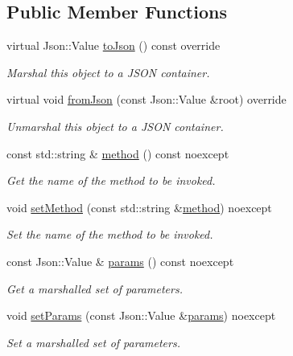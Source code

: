 \subsection*{Public Member Functions}
\begin{DoxyCompactItemize}
\item 
virtual Json\+::\+Value \hyperlink{classdg_1_1deepcore_1_1network_1_1_json_rpc_request_a5230a36464ddfebcb0dca43edaeae870}{to\+Json} () const override
\begin{DoxyCompactList}\small\item\em Marshal this object to a J\+S\+ON container. \end{DoxyCompactList}\item 
virtual void \hyperlink{classdg_1_1deepcore_1_1network_1_1_json_rpc_request_a7b376d08b80e4231429aaa649c257cb0}{from\+Json} (const Json\+::\+Value \&root) override
\begin{DoxyCompactList}\small\item\em Unmarshal this object to a J\+S\+ON container. \end{DoxyCompactList}\item 
const std\+::string \& \hyperlink{group___network_module_gad706357297f0658e1e695cd7164291ef}{method} () const noexcept
\begin{DoxyCompactList}\small\item\em Get the name of the method to be invoked. \end{DoxyCompactList}\item 
void \hyperlink{group___network_module_gab69275c8a35d2df9026f72f91700085e}{set\+Method} (const std\+::string \&\hyperlink{group___network_module_gad706357297f0658e1e695cd7164291ef}{method}) noexcept
\begin{DoxyCompactList}\small\item\em Set the name of the method to be invoked. \end{DoxyCompactList}\item 
const Json\+::\+Value \& \hyperlink{group___network_module_ga13af70a1e02c7446763e8e44f3484a53}{params} () const noexcept
\begin{DoxyCompactList}\small\item\em Get a marshalled set of parameters. \end{DoxyCompactList}\item 
void \hyperlink{group___network_module_ga2b7b7580f1d8d287c7ef4cf54a381e1e}{set\+Params} (const Json\+::\+Value \&\hyperlink{group___network_module_ga13af70a1e02c7446763e8e44f3484a53}{params}) noexcept
\begin{DoxyCompactList}\small\item\em Set a marshalled set of parameters. \end{DoxyCompactList}\end{DoxyCompactItemize}
